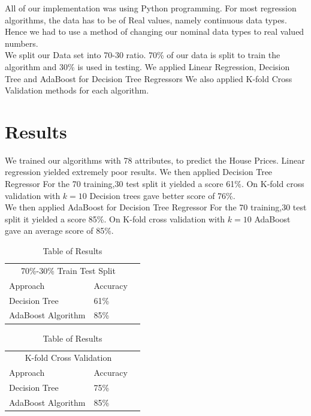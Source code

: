 \documentclass[fleqn,10pt]{SelfArx} %
\begin{document}
	 All of our implementation was using Python programming. For most regression algorithms, the data has to be of Real values, namely continuous data types. Hence we had to use a method of changing our nominal data types to real valued numbers\cite{dict}. \\
	 
	 We split our Data set into 70-30 ratio. 70\% of our data is split to train the algorithm and 30\% is used in testing. We applied Linear Regression, Decision Tree and AdaBoost for Decision Tree Regressors We also applied K-fold Cross Validation methods for each algorithm\cite{kfold}.
	
	
	\section{Results}
	We trained our algorithms with 78 attributes, to predict the House Prices. Linear regression yielded extremely poor results. We then applied Decision Tree Regressor For the 70 training,30 test split it yielded a score 61\%. On K-fold cross validation with $k=10$ Decision trees gave better score of 76\%.\\
	
	We then applied AdaBoost for Decision Tree Regressor For the 70 training,30 test split it yielded a score 85\%. On K-fold cross validation with $k=10$ AdaBoost gave an average score of 85\%.\\
	
	\begin{table}[hbt]
		\caption{Table of Results} \centering \begin{tabular}{llr} \toprule \multicolumn{2}{c}{70\%-30\% Train Test Split} \\ \cmidrule(r){1-2} Approach & Accuracy\\ \midrule Decision Tree & 61\% \\ 
			AdaBoost Algorithm & 85\% \\ \bottomrule \end{tabular} 
		\label{tab:label} 
	\end{table}
	
	\begin{table}[hbt]
		\caption{Table of Results} \centering \begin{tabular}{llr} \toprule \multicolumn{2}{c}{K-fold Cross Validation} \\ \cmidrule(r){1-2} Approach & Accuracy\\ \midrule Decision Tree & 75\% \\ 
				AdaBoost Algorithm & 85\% \\ \bottomrule \end{tabular} 
		\label{tab:label} 
	\end{table}
	
\end{document}
